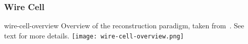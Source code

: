 




\subsubsection{Wire Cell}

\begin{dunefigure}
{wire-cell-overview}
{Overview of the  reconstruction paradigm, taken from~\cite{ref:wc_talk}. 
See text for more details.}
\texttt{[image: wire-cell-overview.png]}\end{dunefigure}



